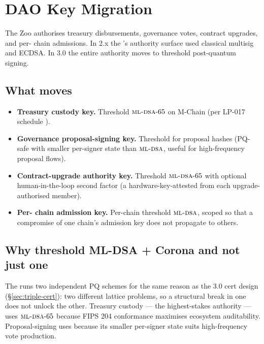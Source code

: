 \section{DAO Key Migration}
\label{sec:dao-migration}

The Zoo \DAO{} authorises treasury disbursements, governance votes,
contract upgrades, and per-\LLM{} chain admissions. In 2.x the
\DAO{}'s authority surface used classical multisig and ECDSA. In 3.0
the entire \DAO{} authority moves to threshold post-quantum signing.

\subsection{What moves}

\begin{itemize}[leftmargin=1.2em]
  \item \textbf{Treasury custody key.} Threshold $\textsc{ml-dsa}{}\text{-}65$
        on M-Chain (per LP-017 schedule \cite{lp-017}).
  \item \textbf{Governance proposal-signing key.} Threshold
        \Corona{} for proposal hashes (PQ-safe with smaller
        per-signer state than $\textsc{ml-dsa}{}$, useful for high-frequency
        proposal flows).
  \item \textbf{Contract-upgrade authority key.} Threshold
        $\textsc{ml-dsa}{}\text{-}65$ with optional human-in-the-loop second
        factor (a hardware-key-attested \MLDSA{} from each
        upgrade-authorised member).
  \item \textbf{Per-\LLM{} chain admission key.} Per-chain
        threshold $\textsc{ml-dsa}{}$, scoped so that a compromise of one
        chain's admission key does not propagate to others.
\end{itemize}

\subsection{Why threshold ML-DSA + Corona and not just one}

The \DAO{} runs two independent PQ schemes for the same reason as
the \Quasar{} 3.0 cert design (\S\ref{sec:triple-cert}): two
different lattice problems, so a structural break in one does not
unlock the other. Treasury custody --- the highest-stakes authority
--- uses $\textsc{ml-dsa}{}\text{-}65$ because FIPS 204 conformance maximises
ecosystem auditability. Proposal-signing uses \Corona{} because
its smaller per-signer state suits high-frequency vote production.

